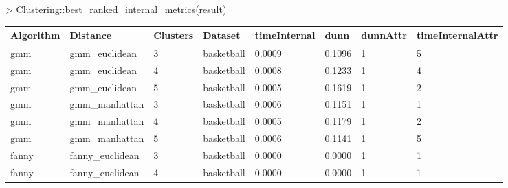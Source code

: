\begin{itemize}
 \begin{Schunk}
\begin{Sinput}
> Clustering::best_ranked_internal_metrics(result)
\end{Sinput}
\end{Schunk}
{\small
\begin{longtable}{| p{1cm} | p{1.8cm} | p{0.9cm} | p{1.1cm} | p{1.6cm} | p{0.8cm} | p{1.3cm} | p{1.8cm} |}
\hline
\scriptsize  Algorithm & \scriptsize     Distance     & \scriptsize Clusters & \scriptsize  Dataset  & \scriptsize timeInternal & \scriptsize  dunn  & \scriptsize dunnAttr & \scriptsize timeInternalAttr \\
\hline
\scriptsize     gmm    & \scriptsize   gmm\_euclidean & \scriptsize    3     & \scriptsize basketball & \scriptsize    0.0009    & \scriptsize 0.1096 & \scriptsize    1     & \scriptsize        5 \\
\scriptsize     gmm    & \scriptsize   gmm\_euclidean & \scriptsize    4     & \scriptsize basketball & \scriptsize    0.0008    & \scriptsize 0.1233 & \scriptsize    1     & \scriptsize        4 \\
\scriptsize     gmm    & \scriptsize   gmm\_euclidean & \scriptsize    5     & \scriptsize basketball & \scriptsize    0.0005    & \scriptsize 0.1619 & \scriptsize    1     & \scriptsize        2 \\
\cline{2-8}
\scriptsize     gmm    & \scriptsize   gmm\_manhattan & \scriptsize    3     & \scriptsize basketball & \scriptsize    0.0006    & \scriptsize 0.1151 & \scriptsize    1     & \scriptsize        1 \\
\scriptsize     gmm    & \scriptsize   gmm\_manhattan & \scriptsize    4     & \scriptsize basketball & \scriptsize    0.0005    & \scriptsize 0.1179 & \scriptsize    1     & \scriptsize        2 \\
\scriptsize     gmm    & \scriptsize   gmm\_manhattan & \scriptsize    5     & \scriptsize basketball & \scriptsize    0.0006    & \scriptsize 0.1141 & \scriptsize    1     & \scriptsize        5 \\
\hline
\scriptsize   fanny    & \scriptsize fanny\_euclidean & \scriptsize    3     & \scriptsize basketball & \scriptsize    0.0000    & \scriptsize 0.0000 & \scriptsize    1     & \scriptsize        1 \\
\scriptsize   fanny    & \scriptsize fanny\_euclidean & \scriptsize    4     & \scriptsize basketball & \scriptsize    0.0000    & \scriptsize 0.0000 & \scriptsize    1     & \scriptsize        1 \\

\end{longtable}}
\end{itemize}
